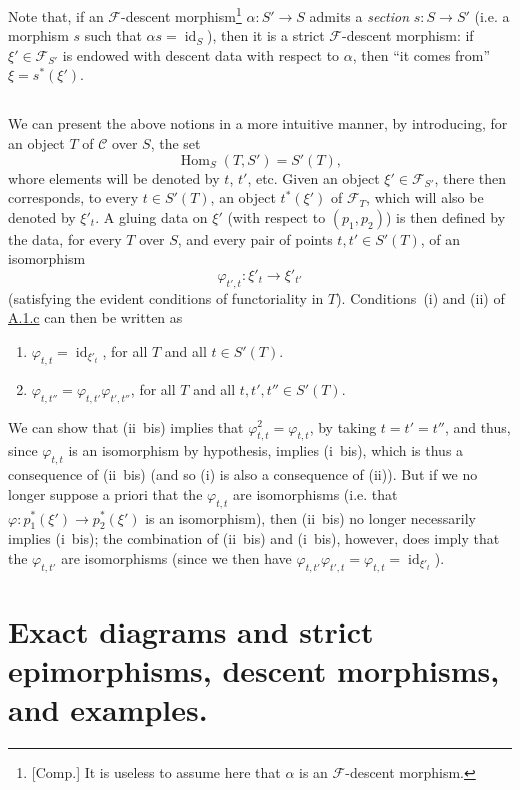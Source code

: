 \documentclass{article}
\theoremstyle{plain}
\theoremstyle{definition}
\newcommand{\sh}[1]{{\mathscr{#1}}}
\newcommand{\cat}[1]{{\mathcal{#1}}}
\DeclareMathOperator{\id}{id}
\DeclareMathOperator{\Hom}{Hom}
\newcommand{\oldpage}[1]{\marginpar{\footnotesize$\Big\vert$ \textit{p.~#1}}}
\begin{document}
Note that, if an $\sh{F}$-descent morphism\footnote{[Comp.] It is useless to assume here that $\alpha$ is an $\sh{F}$-descent morphism.} $\alpha\colon S'\to S$ admits a \emph{section} $s\colon S\to S'$ (i.e. a morphism $s$ such that $\alpha s=\id_S$), then it is a strict $\sh{F}$-descent morphism:
if $\xi'\in\sh{F}_{S'}$ is endowed with descent data with respect to $\alpha$, then ``it comes from'' $\xi=s^*(\xi')$.


\subsection{}
\label{A.1.d}
We can present the above notions in a more intuitive manner, by introducing, for an object $T$ of $\cat{C}$ over $S$, the set
\[
  \Hom_S(T,S') = S'(T),
\]
whore elements will be denoted by $t$, $t'$, etc.
Given an object $\xi'\in\sh{F}_{S'}$, there then corresponds, to every $t\in S'(T)$, an object $t^*(\xi')$ of $\sh{F}_T$, which will also be denoted by $\xi'_t$.
A gluing data on $\xi'$ (with respect to $(p_1,p_2)$) is then defined by the data, for every $T$ over $S$, and every pair of points $t,t'\in S'(T)$, of an isomorphism
\[
  \varphi_{t',t}\colon \xi'_t \to \xi'_{t'}
\]
(satisfying the evident conditions of functoriality in $T$).
Conditions~(i) and (ii) of \hyperref[A.1.c]{A.1.c} can then be written as
\begin{enumerate}[(i {bis})]
  \item $\varphi_{t,t}=\id_{\xi'_t}$, for all $T$ and all $t\in S'(T)$.
\oldpage{190-06}
  \item $\varphi_{t,t''}=\varphi_{t,t'}\varphi_{t',t''}$, for all $T$ and all $t,t',t''\in S'(T)$.
\end{enumerate}

We can show that (ii~bis) implies that $\varphi_{t,t}^2=\varphi_{t,t}$, by taking $t=t'=t''$, and thus, since $\varphi_{t,t}$ is an isomorphism by hypothesis, implies (i~bis), which is thus a consequence of (ii~bis) (and so (i) is also a consequence of (ii)).
But if we no longer suppose a priori that the $\varphi_{t,t}$ are isomorphisms (i.e. that $\varphi\colon p_1^*(\xi')\to p_2^*(\xi')$ is an isomorphism), then (ii~bis) no longer necessarily implies (i~bis);
the combination of (ii~bis) and (i~bis), however, does imply that the $\varphi_{t,t'}$ are isomorphisms (since we then have $\varphi_{t,t'}\varphi_{t',t}=\varphi_{t,t}=\id_{\xi'_t}$).


\section{Exact diagrams and strict epimorphisms, descent morphisms, and examples.}
\label{A.2}
\end{document}
